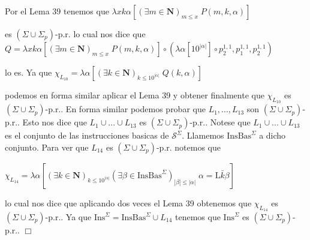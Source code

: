 Por el Lema 39 tenemos que
\(\displaystyle \lambda xk\alpha \left[ (\exists m\in \mathbf{N})_{m\leq x}\;P(m,k,\alpha ) \right] \)

es \((\Sigma \cup \Sigma _{p})\)-p.r. lo cual nos dice que
\(\displaystyle Q=\lambda xk\alpha \left[ (\exists m\in \mathbf{N})_{m\leq x}\;P(m,k,\alpha ) \right] \circ (\lambda \alpha \left[ 10^{\left\vert \alpha \right\vert } \right] \circ p_{2}^{1,1},p_{1}^{1,1},p_{2}^{1,1}) \)

lo es. Ya que
\(\displaystyle \chi _{L_{10}}=\lambda \alpha \left[ (\exists k\in \mathbf{N})_{k\leq 10^{\left\vert \alpha \right\vert }}\;Q(k,\alpha )\right] \)

podemos en forma similar aplicar el Lema 39 y obtener finalmente que \(\chi _{L_{10}}\) es \((\Sigma \cup \Sigma _{p})\)-p.r..
En forma similar podemos probar que \(L_{1},...,L_{13}\) son \((\Sigma \cup \Sigma _{p})\)-p.r.. Esto nos dice que \(L_{1}\cup ...\cup L_{13}\) es \((\Sigma \cup \Sigma _{p})\)-p.r.. Notese que \(L_{1}\cup ...\cup L_{13}\) es el conjunto de las instrucciones basicas de \(\mathcal{S}^{\Sigma }\). Llamemos \( \mathrm{InsBas}^{\Sigma }\) a dicho conjunto. Para ver que \(L_{14}\) es \( (\Sigma \cup \Sigma _{p})\)-p.r. notemos que

\(\displaystyle \chi _{L_{14}}=\lambda \alpha \left[ (\exists k\in \mathbf{N})_{k\leq 10^{\left\vert \alpha \right\vert }}(\exists \beta \in \mathrm{InsBas} ^{\Sigma })_{\left\vert \beta \right\vert \leq \left\vert \alpha \right\vert }\;\alpha =\mathrm{L}\bar{k}\beta \right] \)

lo cual nos dice que aplicando dos veces el Lema 39 obtenemos que \(\chi _{L_{14}}\) es \((\Sigma \cup \Sigma _{p})\)-p.r.. Ya que \( \mathrm{Ins}^{\Sigma }=\mathrm{InsBas}^{\Sigma }\cup L_{14}\) tenemos que \( \mathrm{Ins}^{\Sigma }\) es \((\Sigma \cup \Sigma _{p})\)-p.r.. \(\Box\)
